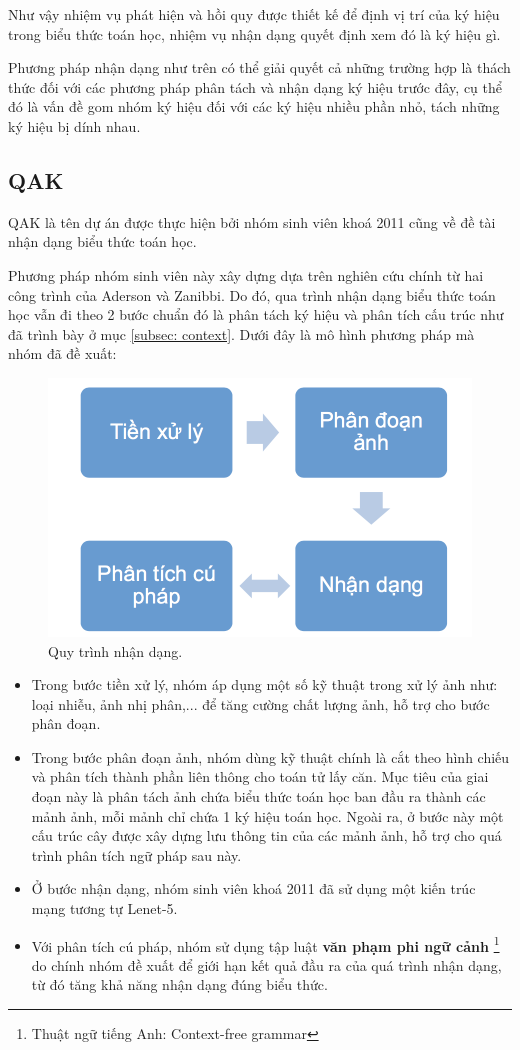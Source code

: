 \documentclass[a4paper,12pt]{article}
\begin{document}
	Như vậy nhiệm vụ phát hiện và hồi quy được thiết kế để định vị trí của ký hiệu trong biểu thức toán học, nhiệm vụ nhận dạng quyết định xem đó là ký hiệu gì.
	
	Phương pháp nhận dạng như trên có thể giải quyết cả những trường hợp là thách thức đối với các phương pháp phân tách và nhận dạng ký hiệu trước đây, cụ thể đó là vấn đề gom nhóm ký hiệu đối với các ký hiệu nhiều phần nhỏ, tách những ký hiệu bị dính nhau.
	
	\subsection{QAK\cite{qak}}
	QAK là tên dự án được thực hiện bởi nhóm sinh viên khoá 2011 cũng về đề tài nhận dạng biểu thức toán học.
	
	Phương pháp nhóm sinh viên này xây dựng dựa trên nghiên cứu chính từ hai công trình của Aderson\cite{anderson} và Zanibbi\cite{zanibbi}. Do đó, qua trình nhận dạng biểu thức toán học vẫn đi theo 2 bước chuẩn đó là phân tách ký hiệu và phân tích cấu trúc như đã trình bày ở mục \ref{subsec: context}. 
	\newpage
	Dưới đây là mô hình phương pháp mà nhóm đã đề xuất:
	
	\begin{figure}[!h]
		\centering
		\includegraphics[width=0.5\linewidth]{2011.png}
		\vspace{1cm}
		\caption{Quy trình nhận dạng.}
		
	\end{figure}
	
	\begin{itemize}
		\item Trong bước tiền xử lý, nhóm áp dụng một số kỹ thuật trong xử lý ảnh như: loại nhiễu, ảnh nhị phân,... để tăng cường chất lượng ảnh, hỗ trợ cho bước phân đoạn.
		\item Trong bước phân đoạn ảnh, nhóm dùng kỹ thuật chính là cắt theo hình chiếu\cite{segment} và phân tích thành phần liên thông\cite{segment} cho toán tử lấy căn. Mục tiêu của giai đoạn này là phân tách ảnh chứa biểu thức toán học ban đầu ra thành các mảnh ảnh, mỗi mảnh chỉ chứa 1 ký hiệu toán học. Ngoài ra, ở bước này một cấu trúc cây được xây dựng lưu thông tin của các mảnh ảnh, hỗ trợ cho quá trình phân tích ngữ pháp sau này.
		\item Ở bước nhận dạng, nhóm sinh viên khoá 2011 đã sử dụng một kiến trúc mạng tương tự Lenet-5\cite{yanlecun}.
		\item Với phân tích cú pháp, nhóm sử dụng tập luật \textbf{văn phạm phi ngữ cảnh} \footnote{Thuật ngữ tiếng Anh: Context-free grammar} do chính nhóm đề xuất để giới hạn kết quả đầu ra của quá trình nhận dạng, từ đó tăng khả năng nhận dạng đúng biểu thức. 
	\end{itemize}
	
\end{document}
